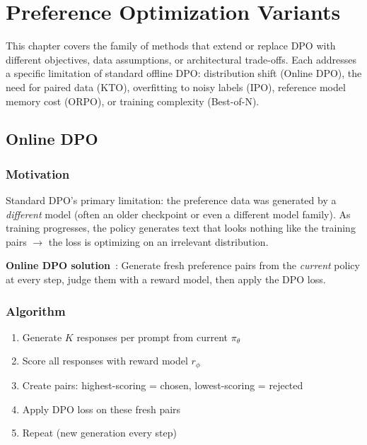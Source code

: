 \chapter{Preference Optimization Variants}
\label{ch:po-variants}

This chapter covers the family of methods that extend or replace DPO with different objectives, data assumptions, or architectural trade-offs. Each addresses a specific limitation of standard offline DPO: distribution shift (Online DPO), the need for paired data (KTO), overfitting to noisy labels (IPO), reference model memory cost (ORPO), or training complexity (Best-of-N).

\section{Online DPO}
\label{sec:online-dpo}

\subsection{Motivation}
\label{motivation}

Standard DPO’s primary limitation: the preference data was generated by a \emph{different} model (often an older checkpoint or even a different model family). As training progresses, the policy generates text that looks nothing like the training pairs $\rightarrow$ the loss is optimizing on an irrelevant distribution.

\textbf{Online DPO solution}~\cite{guo2024direct}: Generate fresh preference pairs from the \emph{current} policy at every step, judge them with a reward model, then apply the DPO loss.

\subsection{Algorithm}
\label{algorithm}

\begin{enumerate}
  \item Generate $K$ responses per prompt from current $\pi_\theta$
  \item Score all responses with reward model $r_\phi$
  \item Create pairs: highest-scoring = chosen, lowest-scoring = rejected
  \item Apply DPO loss on these fresh pairs
  \item Repeat (new generation every step)
\end{enumerate}

